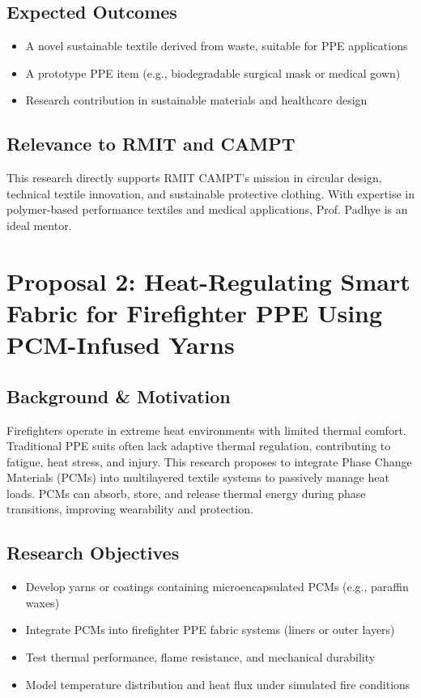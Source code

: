 \documentclass[12pt]{article}
\begin{document}
\subsection*{Expected Outcomes}
\begin{itemize}[noitemsep]
    \item A novel sustainable textile derived from waste, suitable for PPE applications
    \item A prototype PPE item (e.g., biodegradable surgical mask or medical gown)
    \item Research contribution in sustainable materials and healthcare design
\end{itemize}

\subsection*{Relevance to RMIT and CAMPT}
This research directly supports RMIT CAMPT's mission in circular design, technical textile innovation, and sustainable protective clothing. With expertise in polymer-based performance textiles and medical applications, Prof. Padhye is an ideal mentor.

\newpage

\section*{Proposal 2: Heat-Regulating Smart Fabric for Firefighter PPE Using PCM-Infused Yarns}

\subsection*{Background \& Motivation}
Firefighters operate in extreme heat environments with limited thermal comfort. Traditional PPE suits often lack adaptive thermal regulation, contributing to fatigue, heat stress, and injury. This research proposes to integrate Phase Change Materials (PCMs) into multilayered textile systems to passively manage heat loads. PCMs can absorb, store, and release thermal energy during phase transitions, improving wearability and protection.

\subsection*{Research Objectives}
\begin{itemize}[noitemsep]
    \item Develop yarns or coatings containing microencapsulated PCMs (e.g., paraffin waxes)
    \item Integrate PCMs into firefighter PPE fabric systems (liners or outer layers)
    \item Test thermal performance, flame resistance, and mechanical durability
    \item Model temperature distribution and heat flux under simulated fire conditions
\end{itemize}
\end{document}
